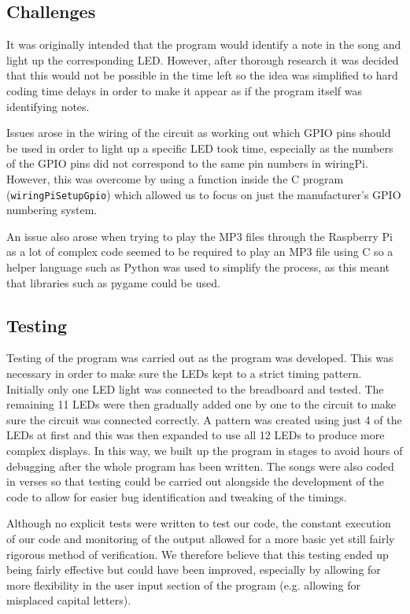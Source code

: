 \documentclass[11pt]{article}
\begin{document}
\subsection{Challenges}

It was originally intended that the program would identify a note in the song and light up the corresponding LED. However, after thorough research it was decided that this would not be possible in the time left so the idea was simplified to hard coding time delays in order to make it appear as if the program itself was identifying notes.

Issues arose in the wiring of the circuit as working out which GPIO pins should be used in order to light up a specific LED took time, especially as the numbers of the GPIO pins did not correspond to the same pin numbers in wiringPi. However, this was overcome by using a function inside the C program (\texttt{wiringPiSetupGpio}) which allowed us to focus on just the manufacturer's GPIO numbering system.

An issue also arose when trying to play the MP3 files through the Raspberry Pi as a lot of complex code seemed to be required to play an MP3 file using C so a helper language such as Python was used to simplify the process, as this meant that libraries such as pygame could be used.

\subsection{Testing}

Testing of the program was carried out as the program was developed. This was necessary in order to make sure the LEDs kept to a strict timing pattern. Initially only one LED light was connected to the  breadboard and tested. The remaining 11 LEDs were then gradually added one by one to the circuit to make sure the circuit was connected correctly. A pattern was created using just 4 of the LEDs at first and this was then expanded to use all 12 LEDs to produce more complex displays. In this way, we built up the program in stages to avoid hours of debugging after the whole program has been written.
The songs were also coded in verses so that testing could be carried out alongside the development of the code to allow for easier bug identification and tweaking of the timings.

Although no explicit tests were written to test our code, the constant execution of our code and monitoring of the output allowed for a more basic yet still fairly rigorous method of verification. We therefore believe that this testing ended up being fairly effective but could have been improved, especially by allowing for more flexibility in the user input section of the program (e.g. allowing for misplaced capital letters).
\end{document}
